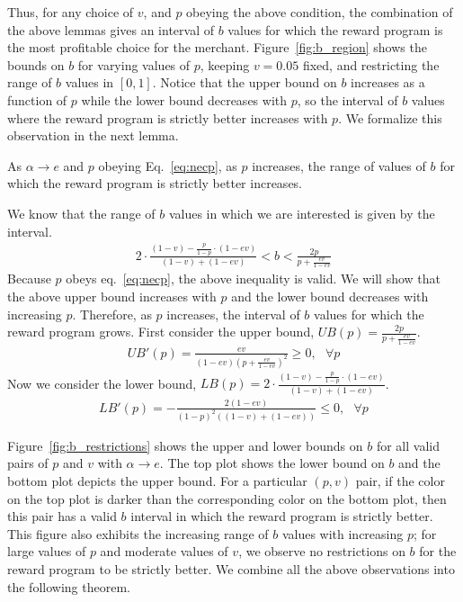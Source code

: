 Thus, for any choice of $v$, and $p$ obeying the above condition, the combination of the above lemmas gives an interval of $b$ values for which the reward program is the most profitable choice for the merchant. 
Figure~\ref{fig:b_region} shows the bounds on $b$ for varying values of $p$, keeping $v = 0.05$ fixed, and restricting the range of $b$ values in $[0,1]$. 
Notice that the upper bound on $b$ increases as a function of $p$ while the lower bound decreases with $p$, so the interval of $b$ values where the reward program is strictly better increases with $p$. 
We formalize this observation in the next lemma. 

\begin{lemma}
As $\alpha \rightarrow e$ and $p$ obeying Eq.~\ref{eq:necp}, as $p$ increases, the range of values of $b$ for which the reward program is strictly better increases.
\end{lemma}

\proof
We know that the range of $b$ values in which we are interested is given by the interval.
\begin{align*}
2\cdot \frac{(1-v) - \frac{p}{1-p}\cdot (1-ev)}{(1-v) + (1-ev)} < b < \frac{2p}{p+\frac{ev}{1-ev}}
\end{align*}
Because $p$ obeys eq.~\ref{eq:necp}, the above inequality is valid. We will show that the above upper bound increases with $p$ and the lower bound decreases with increasing $p$. Therefore, as $p$ increases, the interval of $b$ values for which the reward program grows. First consider the upper bound, $UB(p) = \frac{2p}{p+\frac{ev}{1-ev}}$.
\begin{align*}
UB'(p) = \frac{ev}{(1-ev)\left(p+\frac{ev}{1-ev} \right)^2} \geq 0, \mbox{ } \forall p
\end{align*}
Now we consider the lower bound, $LB(p) = 2\cdot \frac{(1-v) - \frac{p}{1-p}\cdot (1-ev)}{(1-v) + (1-ev)}$.
\begin{align*}
LB'(p) = -\frac{2(1-ev)}{(1-p)^2((1-v)+(1-ev))} \leq 0, \mbox{ } \forall p
\end{align*}
\endproof

Figure~\ref{fig:b_restrictions} shows the upper and lower bounds on $b$ for all valid pairs of $p$ and $v$ with $\alpha \rightarrow e$. 
The top plot shows the lower bound on $b$ and the bottom plot depicts the upper bound. 
For a particular $(p,v)$ pair, if the color on the top plot is darker than the corresponding color on the bottom plot, then this pair has a valid $b$ interval in which the reward program is strictly better. 
This figure also exhibits the increasing range of $b$ values with increasing $p$; for large values of $p$ and moderate values of $v$, we observe no restrictions on $b$ for the reward program to be strictly better. 
We combine all the above observations into the following theorem.

